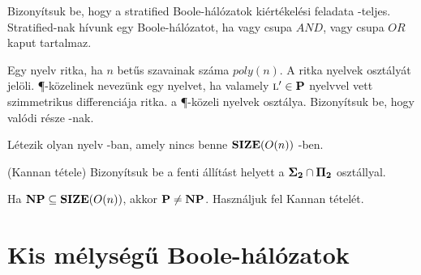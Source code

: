 \begin{Exercise}[counter={sorszam}, difficulty=0]
	Bizonyítsuk be, hogy a stratified Boole-hálózatok kiértékelési feladata \NL-teljes.
	Stratified-nak hívunk egy Boole-hálózatot, ha vagy csupa $AND$, vagy csupa $OR$ kaput tartalmaz.
\end{Exercise}


\begin{Exercise}[counter={sorszam}, difficulty=-1]
	Egy nyelv ritka, ha $n$ betűs szavainak száma $poly(n)$. A ritka nyelvek osztályát \SPARSE jelöli. \P-közelinek nevezünk egy \Language nyelvet, ha valamely $\Language' \in \P$ nyelvvel vett szimmetrikus differenciája ritka.  a \P-közeli nyelvek osztálya. Bizonyítsuk be, hogy  valódi része \Ppoly-nak.
	
\end{Exercise}


\begin{Exercise}[counter={sorszam}, difficulty=1]
	Létezik olyan nyelv \PH-ban, amely nincs benne $\mbox{\ensuremath{\mathbf{SIZE}}}(O(n))$ -ben.
	
\end{Exercise}


\begin{Exercise}[counter={sorszam}, difficulty=2]
	(Kannan tétele) Bizonyítsuk be a fenti állítást \PH helyett a $\mbox{\ensuremath{\mathbf{\Sigma_2}}} \cap \mbox{\ensuremath{\mathbf{\Pi_2}}}$ osztállyal.
\end{Exercise}


\begin{Exercise}[counter={sorszam}, difficulty=-1]
	Ha $\mbox{\ensuremath{\mathbf{NP}}} \subseteq \mbox{\ensuremath{\mathbf{SIZE}}}(O(n))$, akkor $\mbox{\ensuremath{\mathbf{P}}} \neq \mbox{\ensuremath{\mathbf{NP}}}$. Használjuk fel Kannan tételét.
\end{Exercise}




\section{Kis mélységű Boole-hálózatok}

